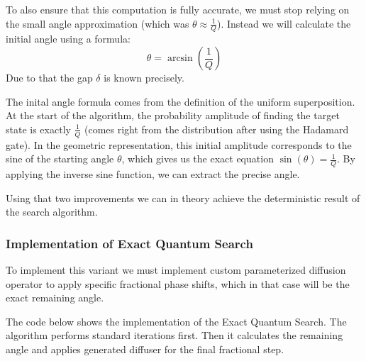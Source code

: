 \bigskip
To also ensure that this computation is fully accurate, we must stop relying on the small angle approximation (which was $\theta \approx \frac{1}{Q}$). 
Instead we will calculate the initial angle using a formula:
\bigskip
\begin{equation}
    \theta = \arcsin (\frac{1}{Q})
\end{equation}
\bigskip
Due to that the gap $\delta$ is known precisely.
%
%

\bigskip
The inital angle formula comes from the definition of the uniform superposition. 
At the start of the algorithm, the probability amplitude of finding the target state is exactly $\frac{1}{Q}$ 
(comes right from the distribution after using the Hadamard gate). 
%
%
In the geometric representation, this initial amplitude corresponds to the sine of the starting angle $\theta$, 
which gives us the exact equation $\sin(\theta) = \frac{1}{Q}$. 
By applying the inverse sine function, we can extract the precise angle.
%
%

\bigskip
Using that two improvements we can in theory achieve the deterministic result of the search algorithm.

\subsubsection{Implementation of Exact Quantum Search}

To implement this variant we must implement custom parameterized diffusion operator to apply specific fractional phase shifts, which in that case will be the exact 
remaining angle.

\bigskip
The code below shows the implementation of the Exact Quantum Search. 
The algorithm performs standard iterations first. Then it calculates the remaining angle and applies generated diffuser for the final fractional step.
%
%

\newpage

